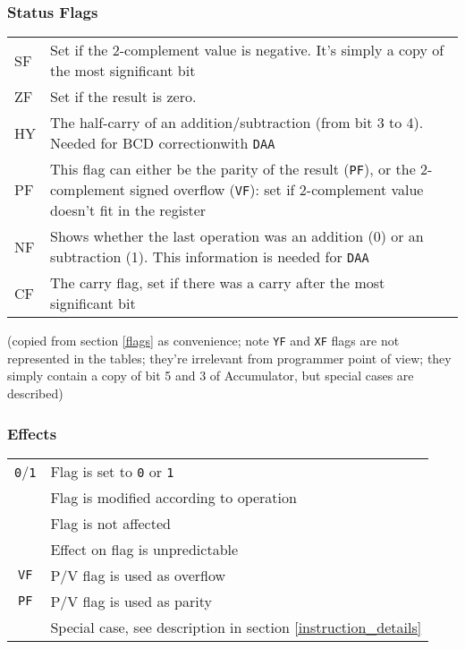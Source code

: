 \documentclass[12pt,twoside,openright,a4paper]{book}
\newcommand{\notet}{\rule{0pt}{2.4ex}}
\begin{document}
\subsubsection{Status Flags}

\begin{tabular}{lp{13cm}}
	SF & 
		Set if the 2-complement value is negative.  It’s simply a copy of the most significant bit \\
	ZF\notet & 
		Set if the result is zero. \\
	HY\notet & 
		The half-carry of an addition/subtraction (from bit 3 to 4). Needed for BCD correctionwith {\tt DAA} \\
	PF\notet & 
		This flag can either be the parity of the result ({\tt PF}), or the 2-complement signed overflow ({\tt VF}): set if 2-complement value doesn’t fit in the register \\
	NF\notet & 
		Shows whether the last operation was an addition (0) or an subtraction  (1). This information is needed for {\tt DAA} \\
	CF\notet & 
		The carry flag, set if there was a carry after the most significant bit \\
\end{tabular}

(copied from section \ref{flags} as convenience; note {\tt YF} and {\tt XF} flags are not represented in the tables; they're irrelevant from programmer point of view; they simply contain a copy of bit 5 and 3 of Accumulator, but special cases are described)

\subsubsection{Effects}

\begin{tabular}{cl}
	{\tt 0}/{\tt 1} & Flag is set to {\tt 0} or {\tt 1} \\
	{\tt \FS} & Flag is modified according to operation \\
	{\tt \FN} & Flag is not affected \\
	{\tt \FU} & Effect on flag is unpredictable \\
	{\tt VF} & P/V flag is used as overflow \\
	{\tt PF} & P/V flag is used as parity \\
	{\tt \FX} & Special case, see description in section \ref{instruction_details}
\end{tabular}


\pagebreak
\end{document}
